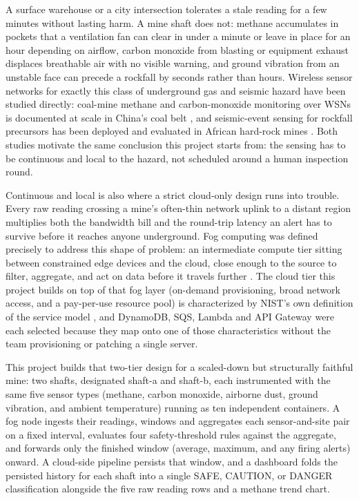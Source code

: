 \documentclass[conference]{IEEEtran}
\begin{document}
A surface warehouse or a city intersection tolerates a stale reading for a few minutes without lasting harm. A mine shaft does not: methane accumulates in pockets that a ventilation fan can clear in under a minute or leave in place for an hour depending on airflow, carbon monoxide from blasting or equipment exhaust displaces breathable air with no visible warning, and ground vibration from an unstable face can precede a rockfall by seconds rather than hours. Wireless sensor networks for exactly this class of underground gas and seismic hazard have been studied directly: coal-mine methane and carbon-monoxide monitoring over WSNs is documented at scale in China's coal belt \cite{ref1}, and seismic-event sensing for rockfall precursors has been deployed and evaluated in African hard-rock mines \cite{ref2}. Both studies motivate the same conclusion this project starts from: the sensing has to be continuous and local to the hazard, not scheduled around a human inspection round.

Continuous and local is also where a strict cloud-only design runs into trouble. Every raw reading crossing a mine's often-thin network uplink to a distant region multiplies both the bandwidth bill and the round-trip latency an alert has to survive before it reaches anyone underground. Fog computing was defined precisely to address this shape of problem: an intermediate compute tier sitting between constrained edge devices and the cloud, close enough to the source to filter, aggregate, and act on data before it travels further \cite{ref3}. The cloud tier this project builds on top of that fog layer (on-demand provisioning, broad network access, and a pay-per-use resource pool) is characterized by NIST's own definition of the service model \cite{ref4}, and DynamoDB, SQS, Lambda and API Gateway were each selected because they map onto one of those characteristics without the team provisioning or patching a single server.

This project builds that two-tier design for a scaled-down but structurally faithful mine: two shafts, designated shaft-a and shaft-b, each instrumented with the same five sensor types (methane, carbon monoxide, airborne dust, ground vibration, and ambient temperature) running as ten independent containers. A fog node ingests their readings, windows and aggregates each sensor-and-site pair on a fixed interval, evaluates four safety-threshold rules against the aggregate, and forwards only the finished window (average, maximum, and any firing alerts) onward. A cloud-side pipeline persists that window, and a dashboard folds the persisted history for each shaft into a single SAFE, CAUTION, or DANGER classification alongside the five raw reading rows and a methane trend chart.
\end{document}
